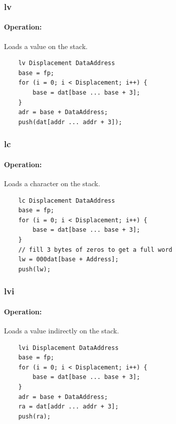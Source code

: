 \subsubsection{lv}

\paragraph{Operation:}
Loads a value on the stack.

	\begin{lstlisting}
	lv Displacement DataAddress
	base = fp;
	for (i = 0; i < Displacement; i++) {
		base = dat[base ... base + 3];
	}
	adr = base + DataAddress;
	push(dat[addr ... addr + 3]);
	\end{lstlisting}

\subsubsection{lc}

\paragraph{Operation:}
Loads a character on the stack.

	\begin{lstlisting}
	lc Displacement DataAddress
	base = fp;
	for (i = 0; i < Displacement; i++) {
		base = dat[base ... base + 3];
	}
	// fill 3 bytes of zeros to get a full word
	lw = 000dat[base + Address];
	push(lw);
	\end{lstlisting}

\subsubsection{lvi}

\paragraph{Operation:}
Loads a value indirectly on the stack.

	\begin{lstlisting}
	lvi Displacement DataAddress
	base = fp;
	for (i = 0; i < Displacement; i++) {
		base = dat[base ... base + 3];
	}
	adr = base + DataAddress;
	ra = dat[addr ... addr + 3];
	push(ra);
	\end{lstlisting}

